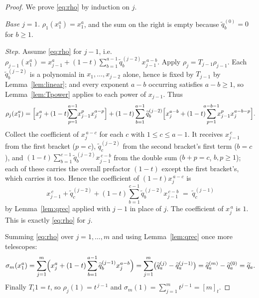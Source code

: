 \documentclass[11pt]{article}
\theoremstyle{plain}
\theoremstyle{definition}
\newcommand{\qt}[1]{[#1]_t}
\newcommand{\sm}{\sigma_m}
\newcommand{\qq}{\widetilde{q}}
\begin{document}
\begin{proof}
We prove \eqref{eq:rho} by induction on $j$.

\emph{Base $j=1$.} $\rho_1(x_1^a)=x_1^a$, and the sum on the right is empty because
$\qq^{(0)}_b=0$ for $b\ge1$.

\emph{Step.} Assume \eqref{eq:rho} for $j-1$, i.e.
$\rho_{j-1}(x_1^a)=x_{j-1}^{a}+(1-t)\sum_{b=1}^{a-1}\qq^{(j-2)}_b x_{j-1}^{\,a-b}$.
Apply $\rho_j=T_{j-1}\rho_{j-1}$. Each $\qq^{(j-2)}_b$ is a polynomial in $x_1,\dots,x_{j-2}$
alone, hence is fixed by $T_{j-1}$ by Lemma~\ref{lem:linear}; and every exponent $a-b$ occurring
satisfies $a-b\ge1$, so Lemma~\ref{lem:Tpower} applies to each power of $x_{j-1}$. Thus
\[
  \rho_j(x_1^a)=\Bigl[x_j^{a}+(1-t)\!\!\sum_{p=1}^{a-1}\!x_{j-1}^{p}x_j^{a-p}\Bigr]
  +(1-t)\sum_{b=1}^{a-1}\qq^{(j-2)}_b\Bigl[x_j^{a-b}+(1-t)\!\!\!\sum_{p=1}^{a-b-1}\!\!\!x_{j-1}^{p}x_j^{a-b-p}\Bigr].
\]
Collect the coefficient of $x_j^{\,a-c}$ for each $c$ with $1\le c\le a-1$. It receives
$x_{j-1}^{\,c}$ from the first bracket ($p=c$), $\qq^{(j-2)}_c$ from the second bracket's first
term ($b=c$), and $(1-t)\sum_{b=1}^{c-1}\qq^{(j-2)}_b x_{j-1}^{\,c-b}$ from the double sum
($b+p=c$, $b,p\ge1$); each of these carries the overall prefactor $(1-t)$ except the first
bracket's, which carries it too. Hence the coefficient of $(1-t)x_j^{\,a-c}$ is
\[
  x_{j-1}^{\,c}+\qq^{(j-2)}_c+(1-t)\sum_{b=1}^{c-1}\qq^{(j-2)}_b x_{j-1}^{\,c-b}
  \;=\;\qq^{(j-1)}_c
\]
by Lemma~\ref{lem:qrec} applied with $j-1$ in place of $j$. The coefficient of $x_j^{\,a}$ is
$1$. This is exactly \eqref{eq:rho} for $j$.

Summing \eqref{eq:rho} over $j=1,\dots,m$ and using Lemma~\ref{lem:qrec} once more telescopes:
\[
  \sm(x_1^a)=\sum_{j=1}^{m}\Bigl(x_j^{a}+(1-t)\sum_{b=1}^{a-1}\qq^{(j-1)}_b x_j^{a-b}\Bigr)
  =\sum_{j=1}^{m}\bigl(\qq^{(j)}_a-\qq^{(j-1)}_a\bigr)=\qq^{(m)}_a-\qq^{(0)}_a=\qq_a .
\]
Finally $T_i1=t$, so $\rho_j(1)=t^{\,j-1}$ and $\sm(1)=\sum_{j=1}^m t^{j-1}=\qt{m}$.
\end{proof}
\end{document}
